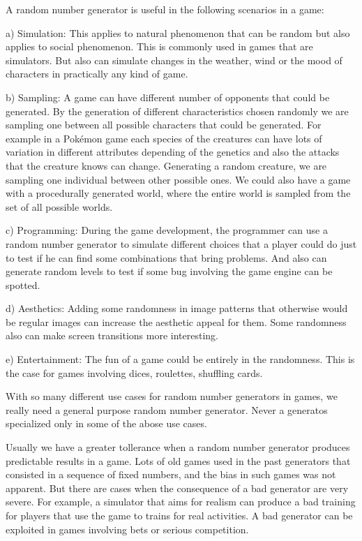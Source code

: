A random number generator is useful in the following scenarios in a
game:

a) Simulation: This applies to natural phenomenon that can be random
 but also applies to social phenomenon. This is commonly used in games
 that are simulators. But also can simulate changes in the weather,
 wind or the mood of characters in practically any kind of game.

b) Sampling: A game can have different number of opponents that could
be generated. By the generation of different characteristics chosen
randomly we are sampling one between all possible characters that
could be generated. For example in a Pokémon game each species of the
creatures can have lots of variation in different attributes depending
of the genetics and also the attacks that the creature knows can
change. Generating a random creature, we are sampling one individual
between other possible ones. We could also have a game with a
procedurally generated world, where the entire world is sampled from
the set of all possible worlds.

c) Programming: During the game development, the programmer can use a
random number generator to simulate different choices that a player
could do just to test if he can find some combinations that bring
problems. And also can generate random levels to test if some bug
involving the game engine can be spotted.

d) Aesthetics: Adding some randomness in image patterns that otherwise
would be regular images can increase the aesthetic appeal for
them. Some randomness also can make screen transitions more
interesting.

e) Entertainment: The fun of a game could be entirely in the
randomness. This is the case for games involving dices, roulettes,
shuffling cards.

With so many different use cases for random number generators in
games, we really need a general purpose random number generator. Never
a generatos specialized only in some of the abose use cases.

Usually we have a greater tollerance when a random number generator
produces predictable results in a game. Lots of old games used in the
past generators that consisted in a sequence of fixed numbers, and the
bias in such games was not apparent. But there are cases when the
consequence of a bad generator are very severe. For example, a
simulator that aims for realism can produce a bad training for players
that use the game to trains for real activities. A bad generator can
be exploited in games involving bets or serious competition.

